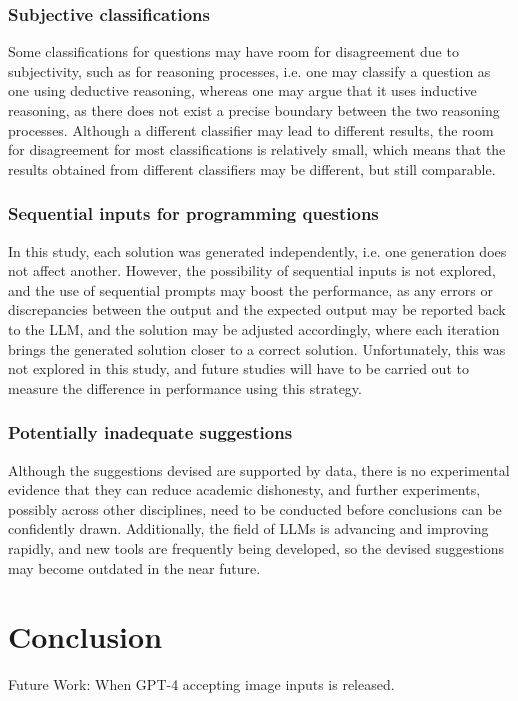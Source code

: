 \documentclass[sigconf,authordraft]{acmart}
\begin{document}
\subsubsection*{Subjective classifications}
Some classifications for questions may have room for disagreement due to subjectivity, such as for reasoning processes, i.e. one may classify a question as one using deductive reasoning, whereas one may argue that it uses inductive reasoning, as there does not exist a precise boundary between the two reasoning processes. Although a different classifier may lead to different results, the room for disagreement for most classifications is relatively small, which means that the results obtained from different classifiers may be different, but still comparable.

\subsubsection*{Sequential inputs for programming questions}
In this study, each solution was generated independently, i.e. one generation does not affect another. However, the possibility of sequential inputs is not explored, and the use of sequential prompts may boost the performance, as any errors or discrepancies between the output and the expected output may be reported back to the LLM, and the solution may be adjusted accordingly, where each iteration brings the generated solution closer to a correct solution. Unfortunately, this was not explored in this study, and future studies will have to be carried out to measure the difference in performance using this strategy.

\subsubsection*{Potentially inadequate suggestions}
Although the suggestions devised are supported by data, there is no experimental evidence that they can reduce academic dishonesty, and further experiments, possibly across other disciplines, need to be conducted before conclusions can be confidently drawn. Additionally, the field of LLMs is advancing and improving rapidly, and new tools are frequently being developed, so the devised suggestions may become outdated in the near future.

\section{Conclusion}
Future Work: When GPT-4 accepting image inputs is released.



\end{document}
